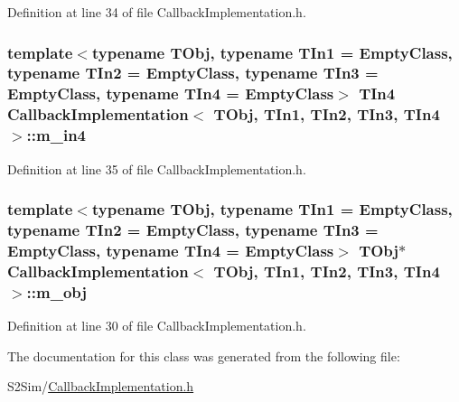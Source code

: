 Definition at line 34 of file Callback\-Implementation.\-h.

\hypertarget{class_callback_implementation_a2bfee544e8870c3f55bdaad8bb4102ec}{
\subsubsection[{m\-\_\-in4}]{\setlength{\rightskip}{0pt plus 5cm}template$<$typename T\-Obj, typename T\-In1 = Empty\-Class, typename T\-In2 = Empty\-Class, typename T\-In3 = Empty\-Class, typename T\-In4 = Empty\-Class$>$ T\-In4 {\bf Callback\-Implementation}$<$ T\-Obj, T\-In1, T\-In2, T\-In3, T\-In4 $>$\-::m\-\_\-in4\hspace{0.3cm}{\ttfamily [private]}}}\label{class_callback_implementation_a2bfee544e8870c3f55bdaad8bb4102ec}


Definition at line 35 of file Callback\-Implementation.\-h.

\hypertarget{class_callback_implementation_a4be5b9ca1d3efb3f42fbf27f2fe9c533}{
\subsubsection[{m\-\_\-obj}]{\setlength{\rightskip}{0pt plus 5cm}template$<$typename T\-Obj, typename T\-In1 = Empty\-Class, typename T\-In2 = Empty\-Class, typename T\-In3 = Empty\-Class, typename T\-In4 = Empty\-Class$>$ T\-Obj$\ast$ {\bf Callback\-Implementation}$<$ T\-Obj, T\-In1, T\-In2, T\-In3, T\-In4 $>$\-::m\-\_\-obj\hspace{0.3cm}{\ttfamily [private]}}}\label{class_callback_implementation_a4be5b9ca1d3efb3f42fbf27f2fe9c533}


Definition at line 30 of file Callback\-Implementation.\-h.



The documentation for this class was generated from the following file\-:\begin{DoxyCompactItemize}
\item 
S2\-Sim/\hyperlink{_callback_implementation_8h}{Callback\-Implementation.\-h}\end{DoxyCompactItemize}
